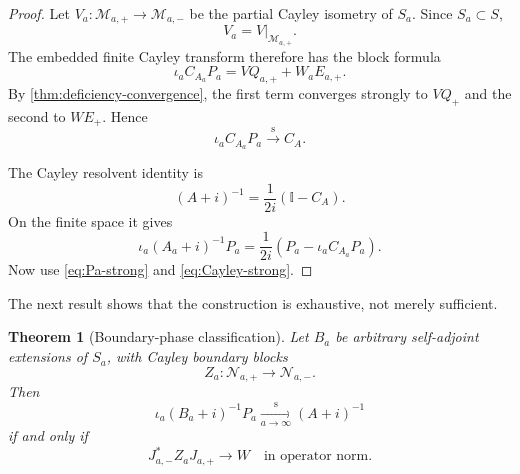 \documentclass[11pt]{article}
\newtheorem{theorem}{Theorem}[section]
\theoremstyle{remark}
\newcommand{\Id}{\mathbb I}
\begin{document}
\begin{proof}
Let $V_a:\mathcal M_{a,+}\to\mathcal M_{a,-}$ be the partial Cayley isometry of $S_a$.  Since
$S_a\subset S$,
\begin{equation}\label{eq:Va-restriction}
 V_a=V|_{\mathcal M_{a,+}}.
\end{equation}
The embedded finite Cayley transform therefore has the block formula
\begin{equation}\label{eq:embedded-Cayley}
 \iota_aC_{A_a}P_a
 =VQ_{a,+}+W_aE_{a,+}.
\end{equation}
By \cref{thm:deficiency-convergence}, the first term converges strongly to $VQ_+$ and the second
to $WE_+$.  Hence
\begin{equation}\label{eq:Cayley-strong}
 \iota_aC_{A_a}P_a\xrightarrow{\mathrm{s}}C_A.
\end{equation}

The Cayley resolvent identity is
\begin{equation}\label{eq:Cayley-resolvent}
 (A+i)^{-1}=\frac1{2i}(\Id-C_A).
\end{equation}
On the finite space it gives
\[
 \iota_a(A_a+i)^{-1}P_a
 =\frac1{2i}\left(P_a-\iota_aC_{A_a}P_a\right).
\]
Now use \eqref{eq:Pa-strong} and \eqref{eq:Cayley-strong}.
\end{proof}

The next result shows that the construction is exhaustive, not merely sufficient.

\begin{theorem}[Boundary-phase classification]\label{thm:phase-classification}
Let $B_a$ be arbitrary self-adjoint extensions of $S_a$, with Cayley boundary blocks
\[
 Z_a:\mathcal N_{a,+}\longrightarrow\mathcal N_{a,-}.
\]
Then
\begin{equation}\label{eq:arbitrary-GSRC}
 \iota_a(B_a+i)^{-1}P_a
 \xrightarrow[a\to\infty]{\mathrm{s}}
 (A+i)^{-1}
\end{equation}
if and only if
\begin{equation}\label{eq:transported-boundary-convergence}
 J_{a,-}^*Z_aJ_{a,+}\longrightarrow W
 \quad\text{in operator norm}.
\end{equation}
\end{theorem}
\end{document}
